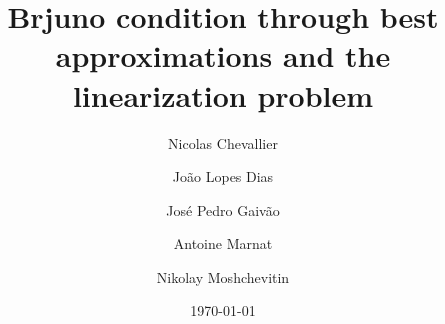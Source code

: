 \documentclass[12pt,reqno,a4paper]{amsart}%
\numberwithin{equation}{section}
\begin{document}
\title[Brjuno condition and best approximations]{Brjuno condition through best approximations and the linearization problem}
\date{\today}

\author[Chevallier]{Nicolas Chevallier}
\address{Département de Mathématiques - IRIMAS,
Université de Haute-Alsace,
18 Rue des Frères Lumière, 68200 Mulhouse, France}

\author[Lopes Dias]{Jo\~{a}o Lopes Dias}
\address{
ISEG Research, ISEG Lisbon School of Economics and Management, Universidade de Lisboa, Lisbon, Portugal
}

\author[Gaiv\~ao]{Jos\'e Pedro Gaiv\~ao}
\address{Departamento de Matem\'atica, ISEG\\
Universidade de Lisboa\\
Rua do Quelhas 6, 1200-781 Lisboa, Portugal}

\author[Marnat]{Antoine Marnat}
\address{Laboratoire d'Analyse et de Mathématiques Appliquées\\
Université Paris Est Créteil - Val de Marne\\
61, avenue du Général de Gaulle\\
Bureau P4 - 407\\
94 010 CRETEIL Cedex, France}


\author[Moshchevitin]{Nikolay Moshchevitin}
\address{Institut für Diskrete Mathematik und Geometrie\\
Technische Universität Wien\\
Freihaus, Wiedner Hauptstraße 8, A-1040, Wien, Österreich}
\end{document}

